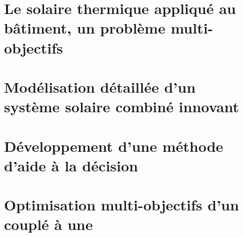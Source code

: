 \documentclass[11pt, oneside]{JeremyThesis}
\begin{document}
\chapter{Le solaire thermique appliqué au bâtiment, un problème multi-objectifs}
% 

\chapter{Modélisation détaillée d’un système solaire combiné innovant}
% 

\chapter{Développement d’une méthode d’aide à la décision}


\chapter{Optimisation multi-objectifs d’un  couplé à une }
% 

% 
\end{document}
